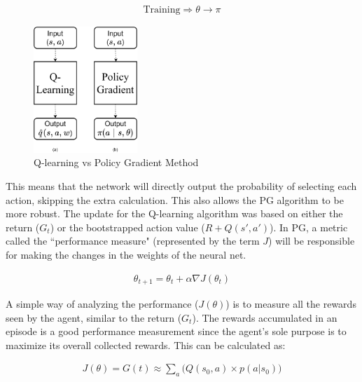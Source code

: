 \begin{align}
    \text{Training} \Longrightarrow \theta \longrightarrow \pi
\end{align}

\begin{figure}[h!]
    \centering
    \includegraphics[width=0.35\textwidth]{Figures/Ch_RL/QL_vs_PG.png}
    \caption{Q-learning vs Policy Gradient Method}
    \label{fig:RL_QLvsPG}
\end{figure}

This means that the network will directly output the probability of selecting each action, skipping the extra calculation. This also allows the PG algorithm to be more robust. The update for the Q-learning algorithm was based on either the return ($G_t$) or the bootstrapped action value ($R + Q(s', a')$). In PG, a metric called the ``performance measure" (represented by the term $J$) will be responsible for making the changes in the weights of the neural net.

\begin{align}
    \theta_{t+1} = \theta_t + \alpha \nabla J(\theta_t)
\end{align}

A simple way of analyzing the performance ($J(\theta)$) is to measure all the rewards seen by the agent, similar to the return ($G_t$). The rewards accumulated in an episode is a good performance measurement since the agent’s sole purpose is to maximize its overall collected rewards. This can be calculated as:

\begin{align}
    J(\theta) = G(t) \approx \sum_a \Big(Q(s_0,a) \times p(a|s_0)\Big) \label{eqn:RL_performance_measure}
\end{align}

